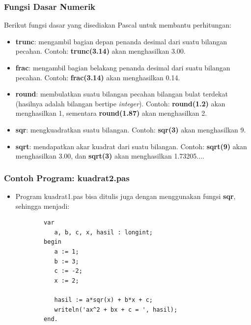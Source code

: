\documentclass{beamer}
\begin{document}
\begin{frame}
\frametitle{Fungsi Dasar Numerik}
Berikut fungsi dasar yang disediakan Pascal untuk membantu perhitungan:
\begin{itemize}
	\item \textbf{trunc}: mengambil bagian depan penanda desimal dari suatu bilangan pecahan. Contoh: \textbf{trunc(3.14)} akan menghasilkan 3.00.
	\item \textbf{frac}: mengambil bagian belakang penanda desimal dari suatu bilangan pecahan. Contoh: \textbf{frac(3.14)} akan menghasilkan 0.14.
	\item \textbf{round}: membulatkan suatu bilangan pecahan bilangan bulat terdekat (hasilnya adalah bilangan bertipe \textit{integer}). Contoh: \textbf{round(1.2)} akan menghasilkan 1, sementara \textbf{round(1.87)} akan menghasilkan 2.
	\item \textbf{sqr}: mengkuadratkan suatu bilangan. Contoh: \textbf{sqr(3)} akan menghasilkan 9.
	\item \textbf{sqrt}: mendapatkan akar kuadrat dari suatu bilangan. Contoh: \textbf{sqrt(9)} akan menghasilkan 3.00, dan \textbf{sqrt(3)} akan menghasilkan 1.73205....
\end{itemize}
\end{frame}

\begin{frame}[fragile]
\frametitle{Contoh Program: kuadrat2.pas}
\begin{itemize}
	\item Program kuadrat1.pas bisa ditulis juga dengan menggunakan fungsi \textbf{sqr}, sehingga menjadi:
	\begin{lstlisting}
		var
		   a, b, c, x, hasil : longint;
		begin
		   a := 1;
		   b := 3;
		   c := -2;
		   x := 2;
		
		   hasil := a*sqr(x) + b*x + c;
		   writeln('ax^2 + bx + c = ', hasil);
		end.
	\end{lstlisting}
\end{itemize}
\end{frame}
\end{document}
